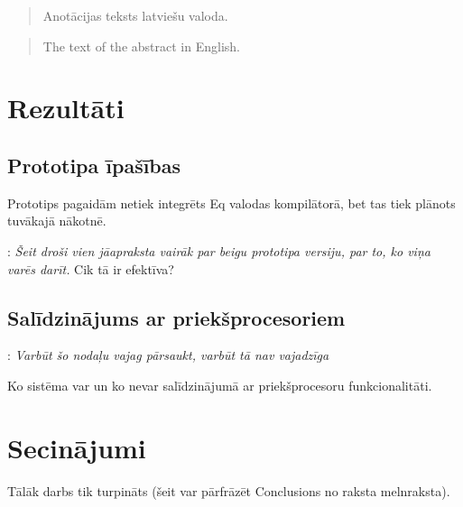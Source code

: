 \documentclass[12pt, a4paper]{report}
\newcommand{\fixme}[1]{\vskip 5mm\noindent{\bf FIXME}: {\it #1}}
\begin{document}
\titullapa

        \begin{abstract}
        Anotācijas teksts latviešu valoda.
        \end{abstract}
        \begin{abstract}
        The text of the abstract in English.
        \end{abstract}













\section{Rezultāti}
\subsection{Prototipa īpašības}
 Prototips pagaidām netiek integrēts Eq valodas kompilātorā, bet tas tiek plānots tuvākajā nākotnē.


\fixme{Šeit droši vien jāapraksta vairāk par beigu prototipa versiju, par to, ko viņa varēs darīt.} Cik tā ir efektīva?



\subsection{Salīdzinājums ar priekšprocesoriem}
\fixme{Varbūt šo nodaļu vajag pārsaukt, varbūt tā nav vajadzīga}

Ko sistēma var un ko nevar salīdzinājumā ar priekšprocesoru funkcionalitāti.

\section{Secinājumi}
Tālāk darbs tik turpināts (šeit var pārfrāzēt Conclusions no raksta melnraksta).



{}

\end{document}
